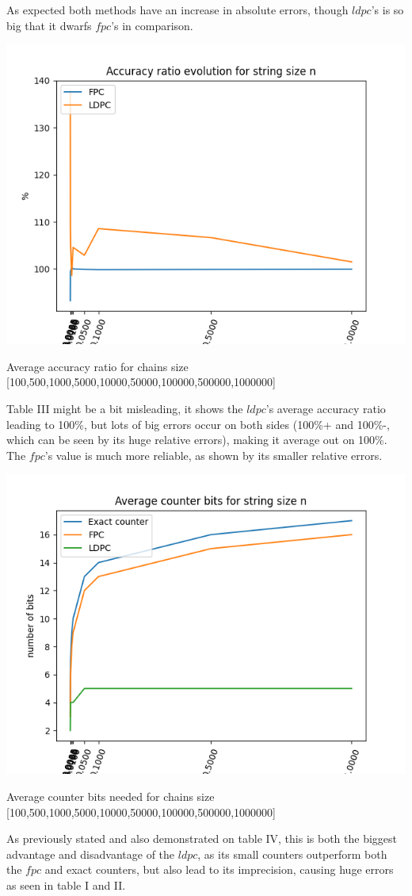 \documentclass[...]{revdetua}
\begin{document}
As expected both methods have an increase in absolute errors, though $ldpc$'s is so big that it dwarfs $fpc$'s in comparison.\par
\begin{table}[H]
\includegraphics[scale=0.5]{accuracy_ratio_big.png}
\caption{Average accuracy ratio for chains size [100,500,1000,5000,10000,50000,100000,500000,1000000]}
\end{table}
Table III might be a bit misleading, it shows the $ldpc$'s average accuracy ratio leading to 100\%, but lots of big errors occur on both sides (100\%+ and 100\%-, which can be seen by its huge relative errors), making it average out on 100\%. The $fpc$'s value is much more reliable, as shown by its smaller relative errors.\par
\begin{table}[H]
\includegraphics[scale=0.5]{average_counter_bits_big.png}
\caption{Average counter bits needed for chains size [100,500,1000,5000,10000,50000,100000,500000,1000000]}
\end{table}
As previously stated and also demonstrated on table IV, this is both the biggest advantage and disadvantage of the $ldpc$, as its small counters outperform both the $fpc$ and exact counters, but also lead to its imprecision, causing huge errors  as seen in  table I and II.\par
\end{document}
